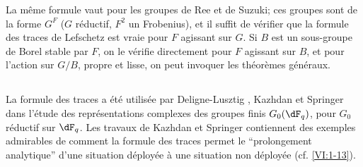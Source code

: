 La même formule vaut pour les groupes de Ree et de Suzuki; ces groupes sont 
de la forme $G^F$ ($G$ réductif, $F^2$ un Frobenius), et il suffit de 
vérifier que la formule des traces de Lefschetz est vraie pour $F$ agissant 
sur $G$. Si $B$ est un sous-groupe de Borel stable par $F$, on le vérifie 
directement pour $F$ agissant sur $B$, et pour l'action sur $G/B$, propre et 
lisse, on peut invoquer les théorèmes généraux. 





\subsection{}\label{VI:8-3}

La formule des traces a été utilisée par Deligne-Lusztig \cite{dl76}, 
Kazhdan \cite{ka77} et Springer \cite{sp76} dans l'étude des 
représentations complexes des groupes finis $G_0(\dF_q)$, pour $G_0$ 
réductif sur $\dF_q$. Les travaux de Kazhdan et Springer contiennent des 
exemples admirables de comment la formule des traces permet le ``prolongement 
analytique'' d'une situation déployée à une situation non déployée 
(cf. \ref{VI:1-13}). 






